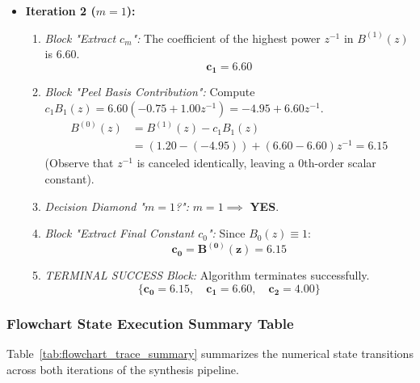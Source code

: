 \documentclass[11pt,a4paper]{article}
\begin{document}
\begin{itemize}
    \item \textbf{Iteration 2 ($m = 1$):}
    \begin{enumerate}
        \item \textit{Block "Extract $c_m$":}
        The coefficient of the highest power $z^{-1}$ in $B^{(1)}(z)$ is $6.60$.
        $$\mathbf{c_1 = 6.60}$$
        \item \textit{Block "Peel Basis Contribution":}
        Compute $c_1 B_1(z) = 6.60(-0.75 + 1.00 z^{-1}) = -4.95 + 6.60 z^{-1}$.
        \begin{align}
        B^{(0)}(z) &= B^{(1)}(z) - c_1 B_1(z) \nonumber \\
        &= (1.20 - (-4.95)) + (6.60 - 6.60) z^{-1} = \mathbf{6.15}
        \end{align}
        (Observe that $z^{-1}$ is canceled identically, leaving a 0th-order scalar constant).
        \item \textit{Decision Diamond "$m = 1$?":}
        $m = 1 \implies$ \textbf{YES}.
        \item \textit{Block "Extract Final Constant $c_0$":}
        Since $B_0(z) \equiv 1$:
        $$\mathbf{c_0 = B^{(0)}(z) = 6.15}$$
        \item \textit{TERMINAL SUCCESS Block:}
        Algorithm terminates successfully.
        $$\mathbf{\{c_0 = 6.15, \quad c_1 = 6.60, \quad c_2 = 4.00\}}$$
    \end{enumerate}
\end{itemize}

\subsubsection*{Flowchart State Execution Summary Table}
Table~\ref{tab:flowchart_trace_summary} summarizes the numerical state transitions across both iterations of the synthesis pipeline.
\end{document}
